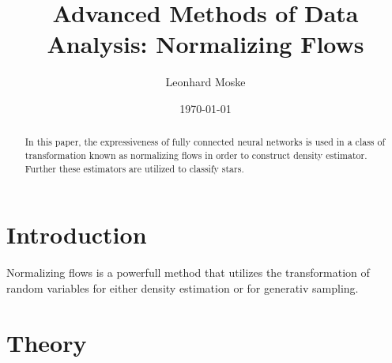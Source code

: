\documentclass[%
 reprint,
 amsmath,amssymb,
 aps,
]{revtex4-2}
\begin{document}
\title{Advanced Methods of Data Analysis: Normalizing Flows}%

\author{Leonhard Moske}



\date{\today}%

\begin{abstract}

In this paper, the expressiveness of fully connected neural networks is used in a class of transformation known as normalizing flows in order to construct density estimator. Further these estimators are utilized to classify stars.

\end{abstract}
\maketitle


\section{Introduction}
Normalizing flows is a powerfull method that utilizes the transformation of random variables for either density estimation or for generativ sampling.


\section{Theory}
\end{document}
